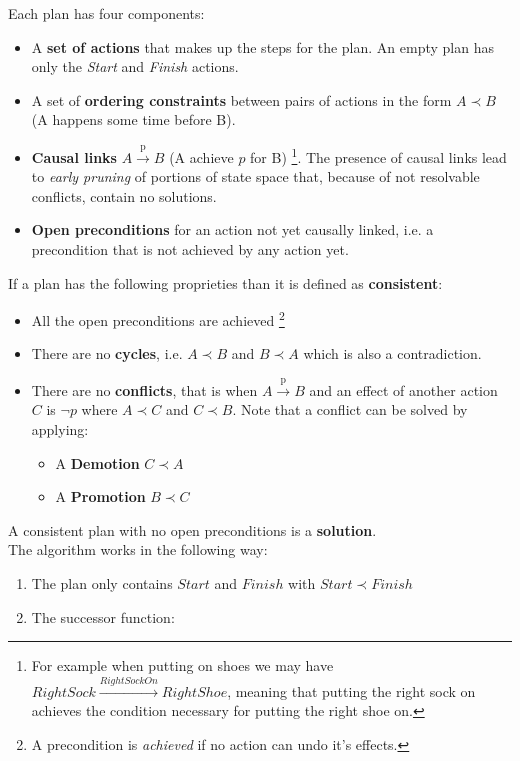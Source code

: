 \documentclass[5pt,a4paper]{article}
\begin{document}
\begin{itemize}
Each plan has four components:

\begin{itemize}
\item A  \textbf{set of actions} that makes up the steps for the plan. An empty plan has only the \textit{Start} and \textit{Finish}  actions.
\item A set of \textbf{ordering constraints} between pairs of actions in the form $A\prec B$ (A happens some time before B).
\item \textbf{Causal links} $A \xrightarrow{\text{p}} B$ (A achieve $p$ for B) \footnote{For example when putting on shoes we may have $RightSock  \xrightarrow{RightSockOn} RightShoe$, meaning that putting the right sock on achieves the condition necessary for putting the right shoe on.}. The presence of causal links lead to \textit{early pruning} of portions of state space that, because of not resolvable conflicts, contain no solutions.

\item \textbf{Open preconditions}  for an action not yet causally linked, i.e. a precondition that is not achieved by any action yet. 
\end{itemize}

If a plan has the following proprieties than it is defined as \textbf{consistent}:
\begin{itemize}
\item All the open preconditions are achieved \footnote{A precondition is \textit{achieved} if no action can undo it's effects.}
\item There are no \textbf{cycles}, i.e. $A\prec B$ and $B \prec A$ which is also a contradiction.
\item There are no \textbf{conflicts}, that is when $A \xrightarrow{\text{p}} B$ and an effect of another action $C$ is $\neg p$ where  $A \prec C$ and  $C \prec B$. Note that a conflict can be solved by applying:
\begin{itemize}
\item A \textbf{Demotion} $C \prec A$
\item A \textbf{Promotion} $B \prec C$
\end{itemize}

\end{itemize}
A consistent plan with no open preconditions is a \textbf{solution}.\\

The algorithm works in the following way:
\begin{enumerate}
\item The plan only contains $Start$ and $Finish$ with $Start \prec Finish$
\item The successor function: 


\end{enumerate}
\end{itemize}
\end{document}
